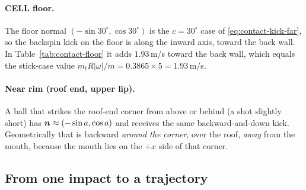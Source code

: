 \paragraph{CELL floor.}
The floor normal $(-\sin30^\circ,\cos30^\circ)$ is the $c=30^\circ$ case of
\eqref{eq:contact-kick-far}, so the backspin kick on the floor is along the inward axis, toward the
back wall. In Table~\ref{tab:contact-floor} it adds $1.93$\,\unit{m/s}\predicted{} toward the back wall,
which equals the stick-case value $m_tR|\omega|/m = 0.3865\times5 = 1.93$\,\unit{m/s}\derived.

\paragraph{Near rim (roof end, upper lip).}
A ball that strikes the roof-end corner from above or behind (a shot slightly short) has
$\bm{n}\approx(-\sin a,\cos a)$ and receives the same backward-and-down kick. Geometrically
that is backward \emph{around the corner}, over the roof, \emph{away} from the mouth, because
the mouth lies on the $+x$ side of that corner.

\subsection{From one impact to a trajectory}
\label{sec:contact-sim}

